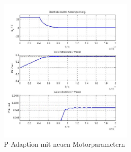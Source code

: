 \begin{figure}[ht]
	\centering
	\includegraphics[width=0.6\textwidth]{Pad-Neue-Werte-P320F1_2F2_160.jpg}
	\caption{P-Adaption mit neuen Motorparametern}
	\label{padneuewerte}
\end{figure}
